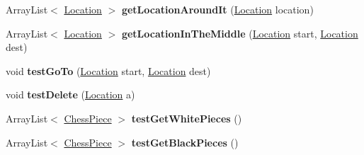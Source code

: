 \begin{DoxyCompactItemize}
\item 
Array\+List$<$ \hyperlink{class_chess_pieces_1_1_location}{Location} $>$ {\bfseries get\+Location\+Around\+It} (\hyperlink{class_chess_pieces_1_1_location}{Location} location)\hypertarget{class_board_and_game_1_1_board_affb2904486fde6fff180ac997e01f1cd}{}\label{class_board_and_game_1_1_board_affb2904486fde6fff180ac997e01f1cd}

\item 
Array\+List$<$ \hyperlink{class_chess_pieces_1_1_location}{Location} $>$ {\bfseries get\+Location\+In\+The\+Middle} (\hyperlink{class_chess_pieces_1_1_location}{Location} start, \hyperlink{class_chess_pieces_1_1_location}{Location} dest)\hypertarget{class_board_and_game_1_1_board_a85ec1c66d5c24efc1b829ea56fb91ccd}{}\label{class_board_and_game_1_1_board_a85ec1c66d5c24efc1b829ea56fb91ccd}

\item 
void {\bfseries test\+Go\+To} (\hyperlink{class_chess_pieces_1_1_location}{Location} start, \hyperlink{class_chess_pieces_1_1_location}{Location} dest)\hypertarget{class_board_and_game_1_1_board_a381092c0a3eb63365acaad6098ad3adc}{}\label{class_board_and_game_1_1_board_a381092c0a3eb63365acaad6098ad3adc}

\item 
void {\bfseries test\+Delete} (\hyperlink{class_chess_pieces_1_1_location}{Location} a)\hypertarget{class_board_and_game_1_1_board_a73bea789be1ef022a3bdde4dfec45abc}{}\label{class_board_and_game_1_1_board_a73bea789be1ef022a3bdde4dfec45abc}

\item 
Array\+List$<$ \hyperlink{class_chess_pieces_1_1_chess_piece}{Chess\+Piece} $>$ {\bfseries test\+Get\+White\+Pieces} ()\hypertarget{class_board_and_game_1_1_board_a9a9d62c6cb54db0900fb4fdbf9631730}{}\label{class_board_and_game_1_1_board_a9a9d62c6cb54db0900fb4fdbf9631730}

\item 
Array\+List$<$ \hyperlink{class_chess_pieces_1_1_chess_piece}{Chess\+Piece} $>$ {\bfseries test\+Get\+Black\+Pieces} ()\hypertarget{class_board_and_game_1_1_board_ace2944e1ea40b215d62ffc8572ef9c0b}{}\label{class_board_and_game_1_1_board_ace2944e1ea40b215d62ffc8572ef9c0b}

\end{DoxyCompactItemize}
